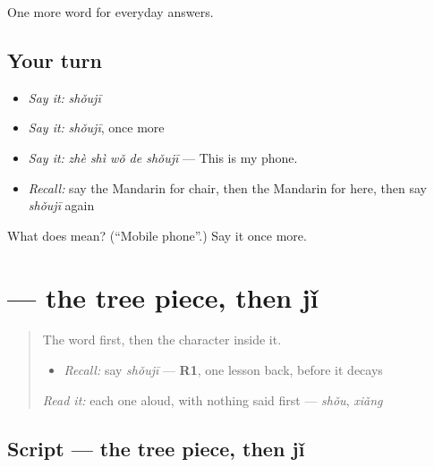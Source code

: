 \begin{grammarlens}[title={What you've built}]
One more word for everyday answers.
\end{grammarlens}

\subsection*{Your turn}
\begin{itemize}
\raggedright
  \item \emph{Say it:} \emph{shǒujī}
  \item \emph{Say it:} \emph{shǒujī}, once more
  \item \emph{Say it:} \emph{zhè shì wǒ de shǒujī} — This is my phone.
  \item \emph{Recall:} say the Mandarin for chair, then the Mandarin for here, then say \emph{shǒujī} again
\end{itemize}

\begin{tcolorbox}[breakable,colback=teal!4,colframe=teal!35!black,title={Before you move on}]
What does  mean? (\textquotedblleft{}Mobile phone\textquotedblright{}.) Say it once more.
\end{tcolorbox}
\section[\texorpdfstring{\zh{机} (jī)}{机 (jī)}]{ — the tree piece, then jǐ}

\label{lesson:ZH-W58-ji-machine}



\begin{quote}
The word first, then the character inside it.

\begin{itemize}
\raggedright
  \item \emph{Recall:} say \emph{shǒujī} — \textbf{R1}, one lesson back, before it decays
\end{itemize}

\begin{quote}
 
\end{quote}

\emph{Read it:} each one aloud, with nothing said first — \emph{shǒu}, \emph{xiǎng}
\end{quote}

\subsection*{Script — the tree piece, then jǐ}

